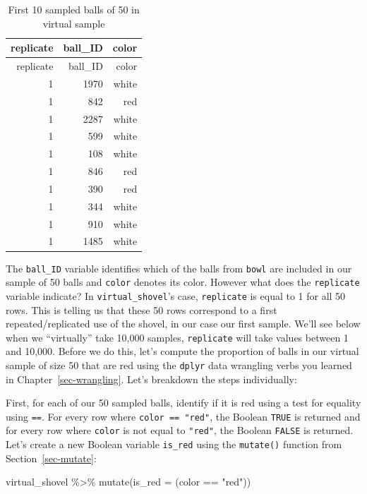 \documentclass[
  letterpaper,
  DIV=11,
  numbers=noendperiod]{scrreprt}
\newenvironment{Shaded}{\begin{snugshade}}{\end{snugshade}}
\newcommand{\AttributeTok}[1]{\textcolor[rgb]{0.40,0.45,0.13}{#1}}
\newcommand{\FunctionTok}[1]{\textcolor[rgb]{0.28,0.35,0.67}{#1}}
\newcommand{\NormalTok}[1]{\textcolor[rgb]{0.00,0.23,0.31}{#1}}
\newcommand{\SpecialCharTok}[1]{\textcolor[rgb]{0.37,0.37,0.37}{#1}}
\newcommand{\StringTok}[1]{\textcolor[rgb]{0.13,0.47,0.30}{#1}}
\theoremstyle{definition}
\theoremstyle{remark}
\begin{document}
\hypertarget{tbl-virtual-shovel}{}
\begin{longtable}[]{@{}rrr@{}}
\caption{\label{tbl-virtual-shovel}First 10 sampled balls of 50 in
virtual sample}\tabularnewline
\toprule()
replicate & ball\_ID & color \\
\midrule()
\endfirsthead
\toprule()
replicate & ball\_ID & color \\
\midrule()
\endhead
1 & 1970 & white \\
1 & 842 & red \\
1 & 2287 & white \\
1 & 599 & white \\
1 & 108 & white \\
1 & 846 & red \\
1 & 390 & red \\
1 & 344 & white \\
1 & 910 & white \\
1 & 1485 & white \\
\bottomrule()
\end{longtable}

The \texttt{ball\_ID} variable identifies which of the balls from
\texttt{bowl} are included in our sample of 50 balls and \texttt{color}
denotes its color. However what does the \texttt{replicate} variable
indicate? In \texttt{virtual\_shovel}'s case, \texttt{replicate} is
equal to 1 for all 50 rows. This is telling us that these 50 rows
correspond to a first repeated/replicated use of the shovel, in our case
our first sample. We'll see below when we ``virtually'' take 10,000
samples, \texttt{replicate} will take values between 1 and 10,000.
Before we do this, let's compute the proportion of balls in our virtual
sample of size 50 that are red using the \texttt{dplyr} data wrangling
verbs you learned in Chapter~\ref{sec-wrangling}. Let's breakdown the
steps individually:

First, for each of our 50 sampled balls, identify if it is red using a
test for equality using \texttt{==}. For every row where
\texttt{color\ ==\ "red"}, the Boolean \texttt{TRUE} is returned and for
every row where \texttt{color} is not equal to \texttt{"red"}, the
Boolean \texttt{FALSE} is returned. Let's create a new Boolean variable
\texttt{is\_red} using the \texttt{mutate()} function from
Section~\ref{sec-mutate}:

\begin{Shaded}
\begin{Highlighting}[]
\NormalTok{virtual\_shovel }\SpecialCharTok{\%\textgreater{}\%} 
  \FunctionTok{mutate}\NormalTok{(}\AttributeTok{is\_red =}\NormalTok{ (color }\SpecialCharTok{==} \StringTok{"red"}\NormalTok{))}
\end{Highlighting}
\end{Shaded}
\end{document}
